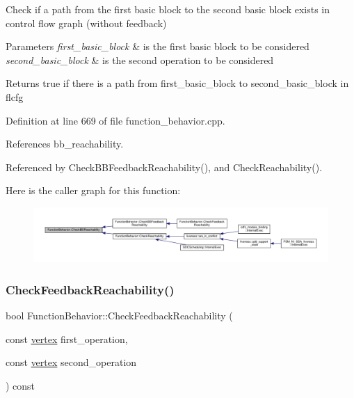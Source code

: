 Check if a path from the first basic block to the second basic block exists in control flow graph (without feedback) 


\begin{DoxyParams}{Parameters}
{\em first\+\_\+basic\+\_\+block} & is the first basic block to be considered \\
\hline
{\em second\+\_\+basic\+\_\+block} & is the second operation to be considered \\
\hline
\end{DoxyParams}
\begin{DoxyReturn}{Returns}
true if there is a path from first\+\_\+basic\+\_\+block to second\+\_\+basic\+\_\+block in flcfg 
\end{DoxyReturn}


Definition at line 669 of file function\+\_\+behavior.\+cpp.



References bb\+\_\+reachability.



Referenced by Check\+B\+B\+Feedback\+Reachability(), and Check\+Reachability().

Here is the caller graph for this function\+:
\nopagebreak
\begin{figure}[H]
\begin{center}
\leavevmode
\includegraphics[width=350pt]{d9/d45/classFunctionBehavior_aa2a720e2f8f4f6d7d3240bbc13f758e9_icgraph}
\end{center}
\end{figure}
\mbox{\label{classFunctionBehavior_a5aa434e53a5779c8f64fc8acdaa86bf1}} 
\subsubsection{\texorpdfstring{Check\+Feedback\+Reachability()}{CheckFeedbackReachability()}}
{\footnotesize\ttfamily bool Function\+Behavior\+::\+Check\+Feedback\+Reachability (\begin{DoxyParamCaption}\item[{const \hyperlink{graph_8hpp_abefdcf0544e601805af44eca032cca14}{vertex}}]{first\+\_\+operation,  }\item[{const \hyperlink{graph_8hpp_abefdcf0544e601805af44eca032cca14}{vertex}}]{second\+\_\+operation }\end{DoxyParamCaption}) const}




